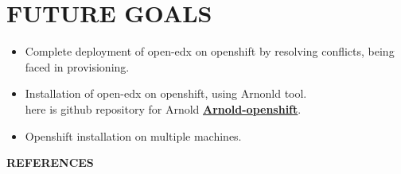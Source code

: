 \documentclass[11pt]{report}
\begin{document}
	\section{FUTURE GOALS}
	\Large
	\begin{itemize}
		\item Complete deployment of open-edx on openshift by resolving conflicts, being faced in provisioning.
		\vspace{0.3cm}
		\item  Installation of open-edx on openshift, using Arnonld tool.
		\\
		here is github repository for Arnold
		\textbf{ \href{https://github.com/openfun/arnold}{Arnold-openshift}}.
		\vspace{0.3cm}
		\item Openshift installation on multiple machines.
	\end{itemize}
	\pagebreak
	\textbf{REFERENCES}
	\large
\end{document}
